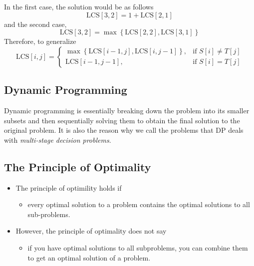 \documentclass[12pt]{article}
\begin{document}
In the first case, the solution would be as follows
\begin{equation}
  \mathrm{LCS}\left[3,2\right] = 1+\mathrm{LCS}\left[2,1\right]
\end{equation}
and the second case,
\begin{equation}
  \mathrm{LCS}\left[3,2\right] = \max\left\{\mathrm{LCS}\left[2,2\right],\mathrm{LCS}\left[3,1\right]\right\}
\end{equation}
Therefore, to generalize
\begin{equation}
  \mathrm{LCS}\left[i,j\right] = \begin{cases}\max\left\{\mathrm{LCS}\left[i-1,j\right],\mathrm{LCS}\left[i,j-1\right]\right\},& \text{if $S\left[i\right]\neq T\left[j\right]$}\\ \mathrm{LCS}\left[i-1,j-1\right],&\text{if $S\left[i\right]=T\left[j\right]$} \end{cases}
\end{equation}
\subsection{Dynamic Programming}
Dynamic programming is essentially breaking down the problem into its smaller subsets and then sequentially solving them to obtain the final solution to the original problem. It is also the reason why we call the problems that DP deals with \emph{multi-stage decision problems}.
\subsection{The Principle of Optimality}
\begin{itemize}
  \item The principle of optimility holds if
  \begin{itemize}
    \item every optimal solution to a problem contains the optimal solutions to all sub-problems.
  \end{itemize}
  \item However, the principle of optimality does not say
  \begin{itemize}
    \item if you have optimal solutions to all subproblems, you can combine them to get an optimal solution of a problem.
  \end{itemize}
\end{itemize}
\end{document}
